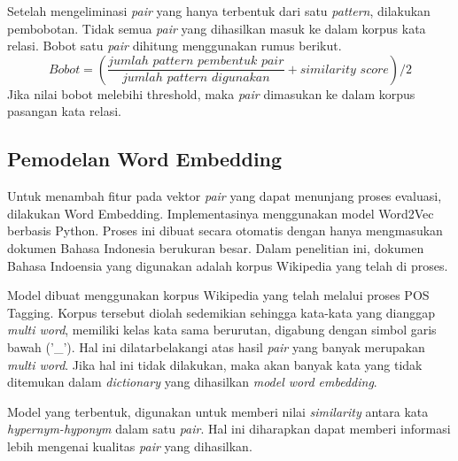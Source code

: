Setelah mengeliminasi \textit{pair} yang hanya terbentuk dari satu \textit{pattern}, dilakukan pembobotan. Tidak semua \textit{pair} yang dihasilkan masuk ke dalam korpus kata relasi. Bobot satu \textit{pair} dihitung menggunakan rumus berikut. 
\[ Bobot = (\frac{jumlah\,\,pattern\,\,pembentuk\,\,pair}{jumlah\,\,pattern\,\,digunakan} + similarity\,\,score)/2 \]
\noindent Jika nilai bobot melebihi threshold, maka \textit{pair} dimasukan ke dalam korpus pasangan kata relasi.



\subsection{Pemodelan Word Embedding}
Untuk menambah fitur pada vektor \textit{pair} yang dapat menunjang proses evaluasi, dilakukan Word Embedding. Implementasinya menggunakan model Word2Vec berbasis Python. Proses ini dibuat secara otomatis dengan hanya mengmasukan dokumen Bahasa Indonesia berukuran besar. Dalam penelitian ini, dokumen Bahasa Indoensia yang digunakan adalah korpus Wikipedia yang telah di proses.

Model dibuat menggunakan korpus Wikipedia yang telah melalui proses POS Tagging. Korpus tersebut diolah sedemikian sehingga kata-kata yang dianggap \textit{multi word}, memiliki kelas kata sama berurutan, digabung dengan simbol garis bawah ('\_'). Hal ini dilatarbelakangi atas hasil \textit{pair} yang banyak merupakan \textit{multi word}. Jika hal ini tidak dilakukan, maka akan banyak kata yang tidak ditemukan dalam \textit{dictionary} yang dihasilkan \textit{model word embedding}.

Model yang terbentuk, digunakan untuk memberi nilai \textit{similarity} antara kata \textit{hypernym-hyponym} dalam satu \textit{pair}. Hal ini diharapkan dapat memberi informasi lebih mengenai kualitas \textit{pair} yang dihasilkan.
